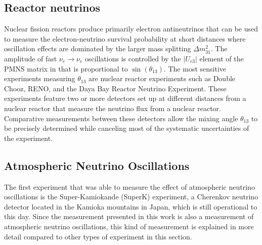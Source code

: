 \subsection{Reactor neutrinos}
Nuclear fission reactors produce primarily electron antineutrinos that can be used to measure the electron-neutrino survival probability at short distances where oscillation effects are dominated by the larger mass splitting $\Delta m^2_{31}$.
The amplitude of fast $\nu_e\rightarrow\nu_e$ oscillations is controlled by the $|U_{e3}|$ element of the PMNS matrix in  that is proportional to $\sin(\theta_{13})$.
The most sensitive experiments measuring $\theta_{13}$ are nuclear reactor experiments such as Double Chooz\cite{CABRERA201287}, RENO\cite{RENO:2010vlj}, and the Daya Bay Reactor Neutrino Experiment\cite{DayaBay:2007fgu}.
These experiments feature two or more detectors set up at different distances from a nuclear reactor that measure the neutrino flux from a nuclear reactor.
Comparative measurements between these detectors allow the mixing angle $\theta_{13}$ to be precisely determined while canceling most of the systematic uncertainties of the experiment.

\subsection{Atmospheric Neutrino Oscillations}
The first experiment that was able to measure the effect of atmospheric neutrino oscillations is the Super-Kamiokande (SuperK) experiment\cite{PhysRevLett.81.1562}, a Cherenkov neutrino detector located in the Kamioka mountains in Japan, which is still operational to this day.
Since the measurement presented in this work is also a measurement of atmospheric neutrino oscillations, this kind of measurement is explained in more detail compared to other types of experiment in this section.

